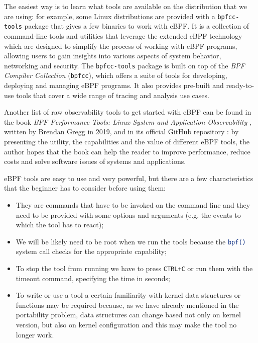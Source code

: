 The easiest way is to learn what tools are available on the distribution that we are using: for example, some Linux distributions are provided with a \colorbox{backcolour}{\lstinline[style=commandline, language=bash, breaklines=true]|bpfcc-tools|} package that gives a few binaries to work with eBPF.
It is a collection of command-line tools and utilities that leverage the extended eBPF technology which are designed to simplify the process of working with eBPF programs, allowing users to gain insights into various aspects of system behavior, networking and security.
The \colorbox{backcolour}{\lstinline[style=commandline, language=bash, breaklines=true]|bpfcc-tools|} package is built on top of the \textit{BPF Compiler Collection} (\colorbox{backcolour}{\lstinline[style=commandline, language=bash, breaklines=true]|bpfcc|}), which offers a suite of tools for developing, deploying and managing eBPF programs. 
It also provides pre-built and ready-to-use tools that cover a wide range of tracing and analysis use cases. 

Another list of raw observability tools to get started with eBPF can be found in the book \textit{BPF Performance Tools: Linux System and Application Observability} \cite{BPFToolsBookWebsite}, written by Brendan Gregg in 2019, and in its official GitHub repository \cite{BPFToolsBookGitHubRepo}: by presenting the utility, the capabilities and the value of different eBPF tools, the author hopes that the book can help the reader to improve performance, reduce costs and solve software issues of systems and applications.

eBPF tools are easy to use and very powerful, but there are a few characteristics that the beginner has to consider before using them:

\begin{itemize}
	\item 
		They are commands that have to be invoked on the command line and they need to be provided with some options and arguments (e.g. the events to which the tool has to react);
	\item 
		We will be likely need to be root when we run the tools because the \colorbox{backcolour}{\lstinline[style=commandline, language=bash, breaklines=true]|bpf()|} system call checks for the appropriate capability;
	\item 
		To stop the tool from running we have to press \colorbox{backcolour}{\lstinline[style=commandline, language=bash, breaklines=true]|CTRL+C|} or run them with the timeout command, specifying the time in seconds;
	\item 
		To write or use a tool a certain familiarity with kernel data structures or functions may be required because, as we have already mentioned in the portability problem, data structures can change based not only on kernel version, but also on kernel configuration and this may make the tool no longer work.
\end{itemize}

